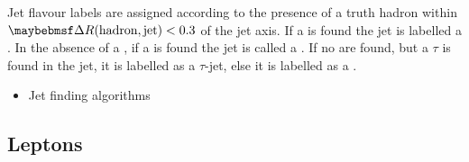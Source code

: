 Jet flavour labels are assigned according to the presence of a truth hadron within ${\DeltaR(\text{hadron},\text{jet})<0.3}$ of the jet axis. If a \bhadron is found the jet is labelled a \bjet. In the absence of a \bhadron, if a \chadron is found the jet is called a \cjet.
If no \borchadrons are found, but a $\tau$ is found in the jet, it is labelled as a $\tau$-jet, else it is labelled as a \ljet.


\begin{itemize}
  \item Jet finding algorithms
\end{itemize}

\subsection{Leptons}\label{sec:leptons}